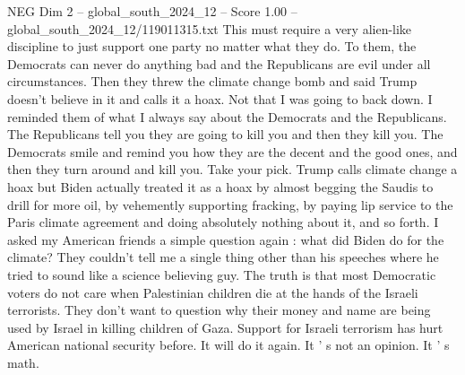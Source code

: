 \begin{textsample}{NEG Dim 2 – global\_south\_2024\_12 – Score 1.00 – global\_south\_2024\_12/119011315.txt}
This must require a very alien-like discipline to just support one party no matter what they do.
To them, the Democrats can never do anything bad and the Republicans are evil under all circumstances.
Then they threw the climate change bomb and said Trump doesn't believe in it and calls it a hoax.
Not that I was going to back down.
I reminded them of what I always say about the Democrats and the Republicans.
The Republicans tell you they are going to kill you and then they kill you.
The Democrats smile and remind you how they are the decent and the good ones, and then they turn around and kill you.
Take your pick.
Trump calls climate change a hoax but Biden actually treated it as a hoax by almost begging the Saudis to drill for more oil, by vehemently supporting fracking, by paying lip service to the Paris climate agreement and doing absolutely nothing about it, and so forth.
I asked my American friends a simple question again : what did Biden do for the climate?
They couldn't tell me a single thing other than his speeches where he tried to sound like a science believing guy.
The truth is that most Democratic voters do not care when Palestinian children die at the hands of the Israeli terrorists.
They don't want to question why their money and name are being used by Israel in killing children of Gaza.
Support for Israeli terrorism has hurt American national security before.
It will do it again.
It ' s not an opinion.
It ' s math.

\end{textsample}
